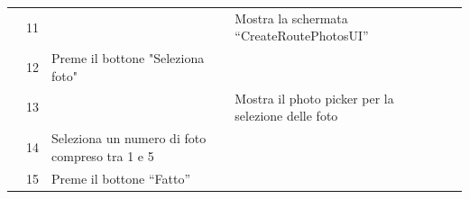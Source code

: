 \documentclass{natourDoc}
\begin{document}
\begin{tabularx}{\linewidth}{| l | p{1cm} | p{4cm} | X | X|}
	\cline{2-5}                   & 11                                                                                                                                     &                                                                                                                                                                      & Mostra la schermata “CreateRoutePhotosUI”           &                                                                                       \\

	\cline{2-5}                   & 12                                                                                                                                     & Preme il bottone "Seleziona foto"                                                                                                                                    &                                                     &                                                                                       \\

	\cline{2-5}                   & 13                                                                                                                                     &                                                                                                                                                                      & Mostra il photo picker per la selezione delle foto  &                                                                                       \\

	\cline{2-5}                   & 14                                                                                                                                     & Seleziona un numero di foto compreso tra 1 e 5                                                                                                                       &                                                     &                                                                                       \\

	\cline{2-5}                   & 15                                                                                                                                     & Preme il bottone “Fatto”                                                                                                                                             &                                                     &                                                                                       \\


\end{tabularx}
\end{document}
